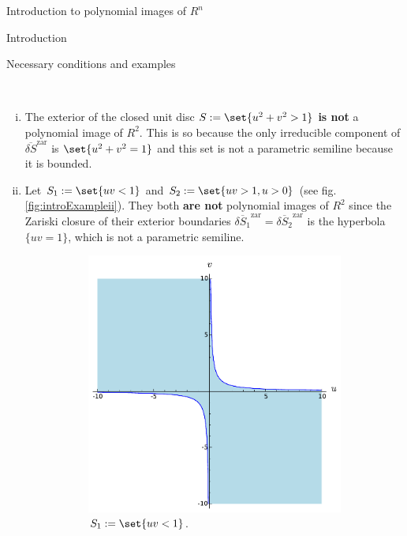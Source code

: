 \documentclass[11pt, a4paper, english, twoside, notitlepage, openright]{report}
\begin{document}
\begin{chapter}{Introduction to polynomial images of $R^n$}
\begin{section}{Introduction}
\begin{subsection}{Necessary conditions and examples}
\begin{examples}\label{introExample}
\
\begin{enumerate}[(i)]
\item The exterior of the closed unit disc $S:=\set{u^2+v^2>1}$ \textbf{is not} a polynomial image of $R^2$. This is so because the only irreducible component of $\overline{\delta S}^{\text{zar}}$ is $\set{u^2+v^2=1}$ and this set is not a parametric semiline because it is bounded.
			
\item Let $S_1:=\set{uv<1}$ and $S_2:=\set{uv>1,u>0}$ (see fig. \ref{fig:introExampleii}). They both \textbf{are not} polynomial images of $R^2$ since the Zariski closure of their exterior boundaries $\overline{\delta S_1}^{\text{zar}}=\overline{\delta S_2}^{\text{zar}}$ is the hyperbola $\{uv=1\}$, which is not a parametric semiline.
\begin{figure}[h]\hspace{0.1cm}
\begin{subfigure}{.49\linewidth}\centering
\includegraphics[width=1\textwidth]{plots/ch1_01_S_1.pdf}
\caption{$S_1:=\set{uv<1}$.\label{fig:S_1}}
\end{subfigure}
\begin{subfigure}{.49\linewidth}\centering

\end{subfigure}
\end{figure}
\end{enumerate}
\end{examples}
\end{subsection}
\end{section}
\end{chapter}
\end{document}
